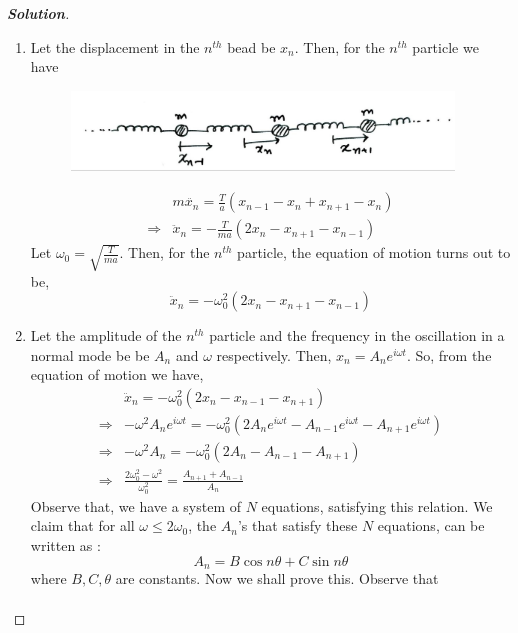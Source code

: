 \documentclass[10pt]{scrartcl}
\theoremstyle{definition}
\newenvironment{solution} {\begin{proof}[\normalfont \textbf{Solution}]} {\end{proof}}
\begin{document}
\begin{solution}
    $ $
    \begin{enumerate}[label={(\alph*)}]
        \item Let the displacement in the $n^{th}$ bead be $x_n$. Then, for the $n^{th}$ particle we have
        \begin{figure}[h]
            \centering
            \includegraphics[width = 4.0in]{beaded_string.jpg}
        \end{figure}
            \begin{align*}
                &m\ddot{x_n} = \frac{T}{a}(x_{n-1} - x_n + x_{n+1} - x_n) \\ 
            \Rightarrow &\ddot{x}_n= -\frac{T}{ma}(2x_n - x_{n+1} - x_{n-1})
            \end{align*}
            Let $\omega_0 = \sqrt{\frac{T}{ma}}$. Then, for the $n^{th}$ particle, the equation of motion turns out to be,
            $$\boxed{\ddot{x}_n= -\omega_0^2(2x_n - x_{n+1} - x_{n-1})}$$
        \item Let the amplitude of the $n^{th}$ particle and the frequency in the oscillation in a normal mode be
            be $A_{n}$ and $\omega$ respectively. Then, $x_n = A_n e^{i\omega t}$. So, from the equation of motion we have,
            \begin{align*}
                &\ddot{x}_n = -\omega_0^2(2x_n - x_{n-1} - x_{n + 1}) \\ 
                \Rightarrow & -\omega^2A_n e^{i \omega t} = -\omega_0^2(2A_n e^{i\omega t} - A_{n-1} e^{i\omega t} - A_{n+1} e^{i\omega t}) \\
                \Rightarrow & -\omega^2A_n= -\omega_0^2(2A_n - A_{n-1} - A_{n+1}) \\
                \Rightarrow &\frac{2\omega_0^2 - \omega^2}{\omega_0^2} = \frac{A_{n+1} + A_{n -1}}{A_n} \tag{i}
            \end{align*}
            Observe that, we have a system of $N$ equations, satisfying this relation.
            We claim that for all $\omega \leq 2\omega_0$, the $A_n$'s that satisfy these $N$ equations, can be written as :
            $$A_n = B\cos n\theta + C\sin{n\theta}$$
            where $B,C,\theta$ are constants.
            Now we shall prove this. Observe that 
            \begin{align*}

\end{align*}
\end{enumerate}
\end{solution}
\end{document}
